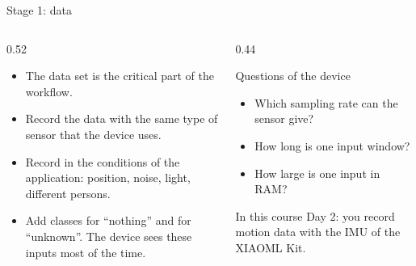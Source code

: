 \begin{frame}{Stage 1: data}
  \begin{columns}[T]
    \begin{column}{0.52\textwidth}
      \begin{itemize}
        \item The data set is the critical part of the workflow.
        \item Record the data with the same type of sensor that the device
              uses.
        \item Record in the conditions of the application: position,
              noise, light, different persons.
        \item Add classes for ``nothing'' and for ``unknown''. The device
              sees these inputs most of the time.
      \end{itemize}
    \end{column}
    \begin{column}{0.44\textwidth}
      \begin{block}{Questions of the device}
        \begin{itemize}
          \item Which sampling rate can the sensor give?
          \item How long is one input window?
          \item How large is one input in RAM?
        \end{itemize}
      \end{block}
      \begin{block}{In this course}
        Day 2: you record motion data with the IMU of the XIAOML Kit.
      \end{block}
    \end{column}
  \end{columns}
\end{frame}

